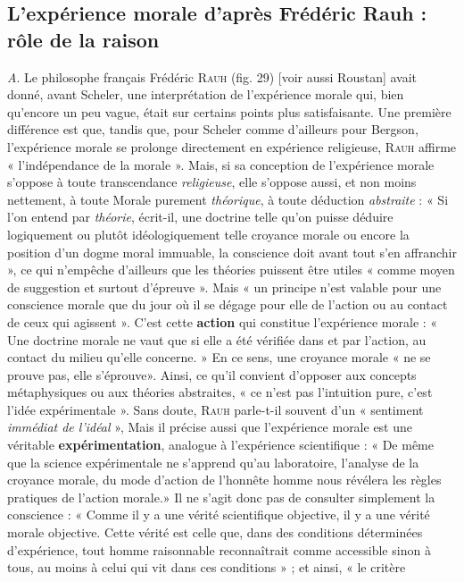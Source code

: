 \subsection{L'expérience morale d’après Frédéric Rauh : rôle de
la raison}%
{\it A}. Le philosophe français Frédéric \textsc{Rauh} (fig. 29)
[voir aussi Roustan] avait donné, avant Scheler, une interprétation
de l’expérience morale qui, bien qu’encore un peu vague, était sur certains
points plus satisfaisante. Une première différence est que, tandis
que, pour Scheler comme d’ailleurs pour Bergson, l’expérience morale
se prolonge directement en expérience religieuse, \textsc{Rauh} affirme « l’indépendance
de la morale ». Mais, si sa conception de l'expérience morale
s’oppose à toute transcendance {\it religieuse}, elle s’oppose aussi, et non
moins nettement, à toute Morale purement {\it théorique}, à toute déduction
{\it abstraite} : « Si l’on entend par {\it théorie}, écrit-il, une doctrine telle qu’on
puisse déduire logiquement ou plutôt idéologiquement telle croyance
morale ou encore la position d’un dogme moral immuable, la conscience
doit avant tout s’en affranchir », ce qui n’empêche d’ailleurs que
les théories puissent être utiles « comme moyen de suggestion et surtout
d’épreuve ». Mais « un principe n’est valable pour une
conscience morale que du jour où il se dégage pour elle de
l’action ou au contact de ceux qui agissent ». C’est cette {\bf action}
qui constitue l’expérience morale : « Une doctrine morale
ne vaut que si elle a été vérifiée dans et par l’action, au
contact du milieu qu’elle concerne. » En ce sens, une croyance
morale « ne se prouve pas, elle s’éprouve». Ainsi, ce qu’il convient
d’opposer aux concepts métaphysiques ou aux théories abstraites, « ce n’est pas
l'intuition pure, c’est l’idée expérimentale ». Sans doute,
\textsc{Rauh} parle-t-il souvent d’un « sentiment {\it immédiat de l'idéal} »,
Mais il précise aussi que l’expérience morale est une véritable
{\bf expérimentation}, analogue à l'expérience scientifique : « De
même que la science expérimentale ne s’apprend qu’au laboratoire,
l’analyse de la croyance morale, du mode d’action de
l’honnête homme nous révélera les règles pratiques de l’action
morale.» Il ne s’agit donc pas de
consulter simplement la conscience : « Comme il y a une
vérité scientifique objective, il y a une vérité morale objective. Cette
vérité est celle que, dans des conditions déterminées d’expérience,
tout homme raisonnable reconnaîtrait comme accessible sinon à tous,
au moins à celui qui vit dans ces conditions » ; et ainsi, « le critère

